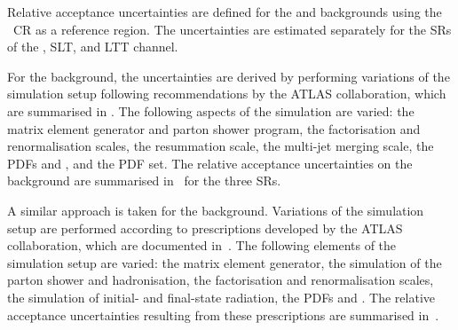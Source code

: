 


Relative acceptance uncertainties are defined for the \ZHF and \ttbar
backgrounds using the \ZHF~CR as a reference region. The uncertainties are
estimated separately for the SRs of the \hadhad, \lephad SLT, and \lephad LTT
channel.

For the \ZHF background, the uncertainties are derived by performing variations
of the simulation setup following recommendations by the ATLAS collaboration,
which are summarised in . The following aspects of
the simulation are varied: the matrix element generator and parton shower
program, the factorisation and renormalisation scales, the resummation scale,
the multi-jet merging scale, the PDFs and \alphas, and the PDF set. The relative
acceptance uncertainties on the \ZHF background are summarised
in~ for the three SRs.

A similar approach is taken for the \ttbar background. Variations of the
simulation setup are performed according to prescriptions developed by the ATLAS
collaboration, which are documented in~. The
following elements of the simulation setup are varied: the matrix element
generator, the simulation of the parton shower and hadronisation, the
factorisation and renormalisation scales, the simulation of initial- and
final-state radiation, the PDFs and \alphas. The relative acceptance
uncertainties resulting from these prescriptions are summarised
in~.


